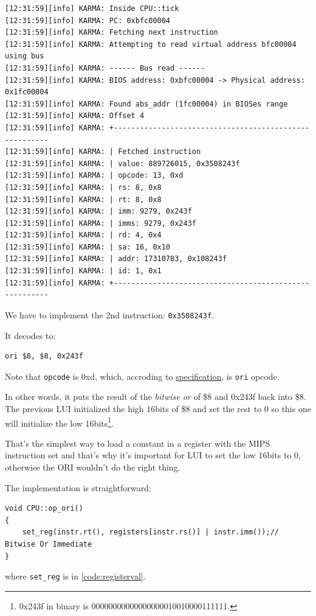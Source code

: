 \documentclass[a4paper]{article}
\newcommand{\code}[1] {\texttt{#1}}
\begin{document}
\begin{verbatim}
[12:31:59][info] KARMA: Inside CPU::tick
[12:31:59][info] KARMA: PC: 0xbfc00004
[12:31:59][info] KARMA: Fetching next instruction
[12:31:59][info] KARMA: Attempting to read virtual address bfc00004 using bus
[12:31:59][info] KARMA: ------ Bus read ------
[12:31:59][info] KARMA: BIOS address: 0xbfc00004 -> Physical address: 0x1fc00004
[12:31:59][info] KARMA: Found abs_addr (1fc00004) in BIOSes range
[12:31:59][info] KARMA: Offset 4
[12:31:59][info] KARMA: +-------------------------------------------------------
[12:31:59][info] KARMA: | Fetched instruction 
[12:31:59][info] KARMA: | value: 889726015, 0x3508243f
[12:31:59][info] KARMA: | opcode: 13, 0xd
[12:31:59][info] KARMA: | rs: 8, 0x8
[12:31:59][info] KARMA: | rt: 8, 0x8
[12:31:59][info] KARMA: | imm: 9279, 0x243f
[12:31:59][info] KARMA: | imms: 9279, 0x243f
[12:31:59][info] KARMA: | rd: 4, 0x4
[12:31:59][info] KARMA: | sa: 16, 0x10
[12:31:59][info] KARMA: | addr: 17310783, 0x108243f
[12:31:59][info] KARMA: | id: 1, 0x1
[12:31:59][info] KARMA: +-------------------------------------------------------
\end{verbatim}

We have to implement the 2nd instruction: \code{0x3508243f}.

It decodes to:

\begin{lstlisting}[language=assembly]
ori $8, $8, 0x243f
\end{lstlisting}

Note that \code{opcode} is 0xd, which, accroding to \href{https://problemkaputt.de/psx-spx.htm#cpuopcodeencoding}{specification}, is \code{ori} opcode.

In other words, it puts the result of the \emph{bitwise or} of \$8 and
0x243f back into \$8. The previous LUI initialized the high
16bits of \$8 and set the rest to 0 so this one will initialize the
low 16bits\footnote{0x243f in binary is 00000000000000000010010000111111.}.

That's the simplest way to load a constant in a register with the MIPS
instruction set and that's why it's important for LUI to set the low
16bits to 0, otherwise the ORI wouldn't do the right thing.

The implementation is straightforward:

\begin{lstlisting}
void CPU::op_ori()
{
	set_reg(instr.rt(), registers[instr.rs()] | instr.imm());// Bitwise Or Immediate
}
\end{lstlisting}
where \code{set\_reg} is in \ref{code:registerval}.
\end{document}
